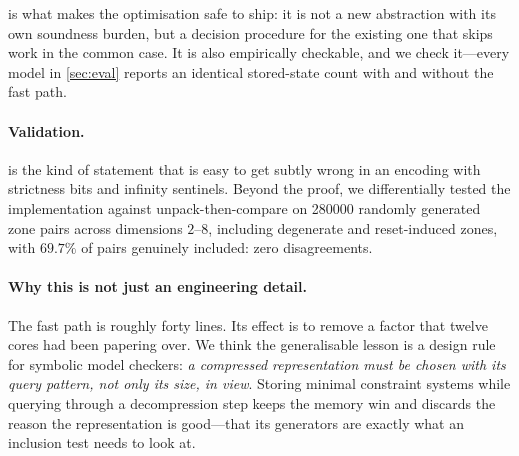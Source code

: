  is what makes the optimisation safe to ship: it is not a
new abstraction with its own soundness burden, but a decision procedure for the
existing one that skips work in the common case.  It is also empirically
checkable, and we check it---every model in \cref{sec:eval} reports an identical
stored-state count with and without the fast path.

\paragraph{Validation.}   is the kind of statement that is
easy to get subtly wrong in an encoding with strictness bits and infinity
sentinels.  Beyond the proof, we differentially tested the implementation
against unpack-then-compare on \num{280000} randomly generated zone pairs across
dimensions $2$--$8$, including degenerate and reset-induced zones, with $69.7\%$
of pairs genuinely included: zero disagreements.

\paragraph{Why this is not just an engineering detail.}  The fast path is
roughly forty lines.  Its effect is to remove a factor that twelve cores had
been papering over.  We think the generalisable lesson is a design rule for
symbolic model checkers: \emph{a compressed representation must be chosen with
its query pattern, not only its size, in view}.  Storing minimal constraint
systems while querying through a decompression step keeps the memory win and
discards the reason the representation is good---that its generators are exactly
what an inclusion test needs to look at.
